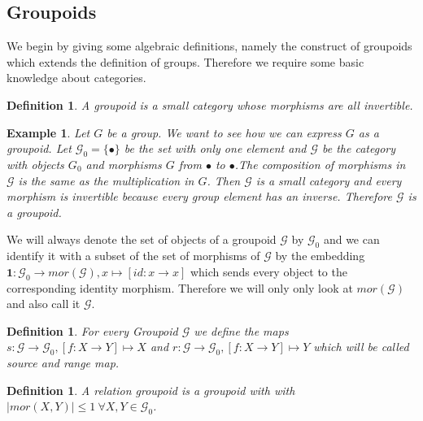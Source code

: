 \documentclass[12pt,a4paper]{scrartcl}
\newtheorem{Definition}[Theorem]{Definition}
\newtheorem{Example}[Theorem]{Example}
\numberwithin{equation}{section}
\newcommand{\2}{\mathbb{Z} / 2 \mathbb{Z}}
\newcommand{\G}{\mathcal{G}}
\newcommand{\1}{\bar{1}}
\newcommand{\0}{\bar{0}}
\begin{document}
\subsection{Groupoids}
We begin by giving some algebraic definitions, namely the construct of groupoids which extends the definition of groups. Therefore we require some basic knowledge about categories. 
\begin{Definition}
	A groupoid is a small category whose morphisms are all invertible.
\end{Definition}
\begin{Example} \label{group}
	Let $G$ be a group. We want to see how we can express $G$ as a groupoid. Let $\mathcal{G}_0 = \{\bullet\}$ be the set with only one element  and $\mathcal{G}$ be the category with objects $G_0$ and morphisms $G$ from $\bullet$ to $\bullet$.The composition of morphisms in $\mathcal{G}$ is the same as the multiplication in $G$. Then $\mathcal{G}$ is a small category and every morphism is invertible because every group element has an inverse. Therefore $\mathcal{G}$ is a groupoid.
\end{Example}
We will always denote the set of objects of a groupoid $\mathcal{G}$ by $\mathcal{G}_0$ and we can identify it with a subset of the set of morphisms of $\mathcal{G}$ by the embedding $\textbf{1}: \mathcal{G}_0 \to mor(\mathcal{G}), x \mapsto [id: x \to x]$ which sends every object to the corresponding identity morphism. Therefore we will only only look at $mor(\mathcal{G})$ and also call it $\mathcal{G}$. 

\begin{Definition}
	For every Groupoid $\mathcal{G}$ we define the maps $s: \mathcal{G} \to \mathcal{G}_0, [f:X \to Y] \mapsto X$ and $r: \mathcal{G} \to \mathcal{G}_0, [f:X \to Y] \mapsto Y$ which will be called source and range map.
\end{Definition}
\begin{Definition}
	A relation groupoid is a groupoid with with $|mor(X, Y)| \leq 1 \ \forall X,Y \in \G_0$.
\end{Definition}
\end{document}
